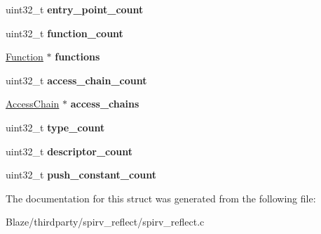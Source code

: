 \begin{DoxyCompactItemize}
uint32\+\_\+t {\bfseries entry\+\_\+point\+\_\+count}
\item 
\mbox{\label{structParser_af27d46d5f6939283d6d926bbb54aeca1}} 
uint32\+\_\+t {\bfseries function\+\_\+count}
\item 
\mbox{\label{structParser_a6bd9e649becd55d121a55b9f467bd171}} 
\hyperlink{structFunction}{Function} $\ast$ {\bfseries functions}
\item 
\mbox{\label{structParser_a5e4ecc191193947b71379f80cc28a37f}} 
uint32\+\_\+t {\bfseries access\+\_\+chain\+\_\+count}
\item 
\mbox{\label{structParser_a93bc3ef7d3438c12ddc36765e199a79e}} 
\hyperlink{structAccessChain}{Access\+Chain} $\ast$ {\bfseries access\+\_\+chains}
\item 
\mbox{\label{structParser_a0954b89778d5de11dbbbad8b0a893ec1}} 
uint32\+\_\+t {\bfseries type\+\_\+count}
\item 
\mbox{\label{structParser_afb04b636a565616e243b7ccb7a19c6bc}} 
uint32\+\_\+t {\bfseries descriptor\+\_\+count}
\item 
\mbox{\label{structParser_af607ae919fda2caaf0165f83a7bdb641}} 
uint32\+\_\+t {\bfseries push\+\_\+constant\+\_\+count}
\end{DoxyCompactItemize}


The documentation for this struct was generated from the following file\+:\begin{DoxyCompactItemize}
\item 
Blaze/thirdparty/spirv\+\_\+reflect/spirv\+\_\+reflect.\+c\end{DoxyCompactItemize}
